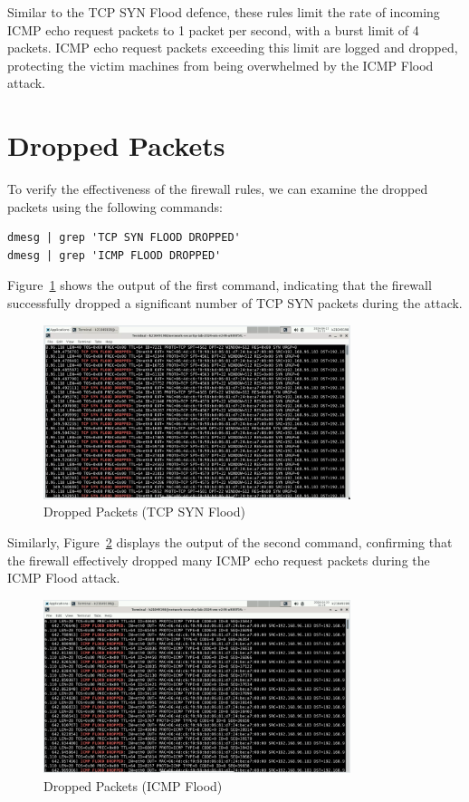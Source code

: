 Similar to the TCP SYN Flood defence, these rules limit the rate of incoming ICMP echo request packets to 1 packet per second, with a burst limit of 4 packets. ICMP echo request packets exceeding this limit are logged and dropped, protecting the victim machines from being overwhelmed by the ICMP Flood attack.

\section{Dropped Packets}
To verify the effectiveness of the firewall rules, we can examine the dropped packets using the following commands:

\begin{verbatim}
dmesg | grep 'TCP SYN FLOOD DROPPED'
dmesg | grep 'ICMP FLOOD DROPPED'
\end{verbatim}

Figure~\ref{fig:TCPSYNFloodDroppedPackets} shows the output of the first command, indicating that the firewall successfully dropped a significant number of TCP SYN packets during the attack.

\begin{figure}[H]
\centering
\includegraphics[width=0.8\textwidth]{img/level4/level4-dropped-packets-TCPSYNFlood.png}
\caption{Dropped Packets (TCP SYN Flood)}\label{fig:TCPSYNFloodDroppedPackets}
\end{figure}

Similarly, Figure~\ref{fig:ICMPFloodDroppedPackets} displays the output of the second command, confirming that the firewall effectively dropped many ICMP echo request packets during the ICMP Flood attack.

\begin{figure}[H]
\centering
\includegraphics[width=0.8\textwidth]{img/level4/level4-dropped-packets-ICMPFlood.png}
\caption{Dropped Packets (ICMP Flood)}\label{fig:ICMPFloodDroppedPackets}
\end{figure}

